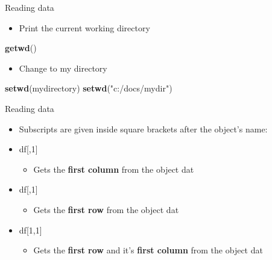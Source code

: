 \documentclass[
  ignorenonframetext,
]{beamer}
\newenvironment{Shaded}{\begin{snugshade}}{\end{snugshade}}
\newcommand{\FunctionTok}[1]{\textcolor[rgb]{0.13,0.29,0.53}{\textbf{#1}}}
\newcommand{\NormalTok}[1]{#1}
\newcommand{\StringTok}[1]{\textcolor[rgb]{0.31,0.60,0.02}{#1}}
\providecommand{\tightlist}{%
  \setlength{\itemsep}{0pt}\setlength{\parskip}{0pt}}
\begin{document}
\begin{frame}[fragile]{Reading data}
\label{reading-data-3}
\begin{itemize}
\tightlist
\item
  Print the current working directory
\end{itemize}

\begin{Shaded}
\begin{Highlighting}[]
\FunctionTok{getwd}\NormalTok{()}
\end{Highlighting}
\end{Shaded}

\begin{itemize}
\tightlist
\item
  Change to my directory
\end{itemize}

\begin{Shaded}
\begin{Highlighting}[]
\FunctionTok{setwd}\NormalTok{(mydirectory)}
\FunctionTok{setwd}\NormalTok{(}\StringTok{"c:/docs/mydir"}\NormalTok{) }
\end{Highlighting}
\end{Shaded}
\end{frame}

\begin{frame}{Reading data}
\label{reading-data-4}
\begin{itemize}
\tightlist
\item
  Subscripts are given inside square brackets after the object's name:
\item
  df{[},1{]}

  \begin{itemize}
  \tightlist
  \item
    Gets the \textbf{first column} from the object dat
  \end{itemize}
\item
  df{[},1{]}

  \begin{itemize}
  \tightlist
  \item
    Gets the \textbf{first row} from the object dat
  \end{itemize}
\item
  df{[}1,1{]}

  \begin{itemize}
  \tightlist
  \item
    Gets the \textbf{first row} and it's \textbf{first column} from the
    object dat
  \end{itemize}
\end{itemize}
\end{frame}
\end{document}
